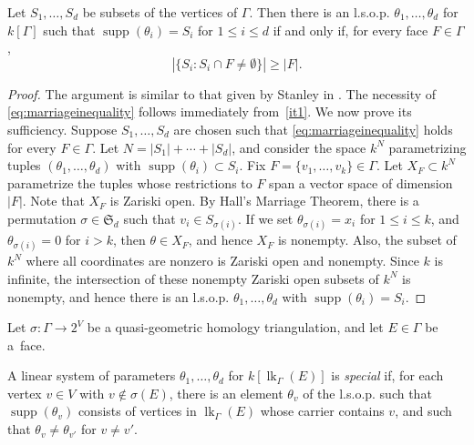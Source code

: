\documentclass[ALCO, Unicode,published]{cedram}
\DeclareMathOperator{\lk}{lk}
\DeclareMathOperator{\supp}{supp}
\begin{document}
\begin{lemma} \label{lemma:lsopexistence}
Let $S_1, \ldots, S_d$ be subsets of the vertices of $\Gamma$.  Then there is an l.s.o.p. $\theta_1, \ldots, \theta_d$ for $k[\Gamma]$ such that $\supp (\theta_i) = S_i$ for $1 \leq i \leq d$ if and only if, for every face $F \in \Gamma$,
\begin{equation} \label{eq:marriageinequality}
| \{ S_i : S_i \cap F \neq \emptyset \}| \geq |F|.
\end{equation}
\end{lemma}

\begin{proof} 
The argument is similar to that given by Stanley in \cite[Corollary~4.4]{Stanley92}. The necessity of \eqref{eq:marriageinequality} follows immediately from~\ref{it1}. We now prove its sufficiency.  Suppose $S_1, \ldots, S_d$ are chosen such that \eqref{eq:marriageinequality} holds for every 
$F \in \Gamma$.    
Let $N = |S_1| + \cdots + |S_d|$, and consider the space $k^N$ 
parametrizing tuples $(\theta_1, \ldots, \theta_d)$
with $\supp (\theta_i) \subset S_i$.
Fix $F = \{v_1, \dotsc, v_k\} \in \Gamma$.
Let $X_F \subset k^N$  parametrize the tuples 
 whose restrictions to $F$ 
 span a vector space of dimension $|F|$.
Note that $X_F$ is Zariski open.  
By Hall's Marriage Theorem, there is a permutation $\sigma \in \mathfrak{S}_d$ such that $v_i \in S_{\sigma(i)}$. If we set $\theta_{\sigma(i)} = x_i$ for $1 \le i \le k$, and $\theta_{\sigma(i)} = 0$ for $i > k$, then $\theta \in X_F$, and hence $X_F$ is nonempty. Also, the subset of $k^N$ where all coordinates are nonzero is Zariski open and nonempty.  Since $k$ is infinite, the intersection of these nonempty Zariski open subsets of $k^N$ is nonempty, and hence there is an l.s.o.p. $\theta_1, \ldots, \theta_d$ with $\supp(\theta_i)= S_i$. 
\end{proof}




Let $\sigma \colon \Gamma \to 2^V$ be a quasi-geometric homology triangulation,   and let $E \in \Gamma$ be a~face. 

\begin{definition} \label{def:special} A linear system of parameters $\theta_1, \dotsc, \theta_{d}$ for $k[\lk_{\Gamma}(E)]$ is \textit{special} if, for each vertex $v \in V$ with $v \not \in \sigma(E)$, there is an element $\theta_v$ of the l.s.o.p. such that $\supp(\theta_v)$ consists of vertices in $\lk_{\Gamma}(E)$  whose carrier contains $v$, and such that $\theta_v \not= \theta_{v'}$ for $v \not= v'$. 
\end{definition}
\end{document}
